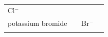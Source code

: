 \begin{enumerate}[noitemsep, label=\textbf{\arabic*}. ]
{\begin{center}
\begin{xtabular*}{\mytablewidth}[t]{|p{10\mystarwidth}|p{10\mystarwidth}|p{10\mystarwidth}|p{10\mystarwidth}|}
    
        \begin{math}\mathrm{Cl}{}^{-}\end{math} &
    
    
     \tabularnewline{}
    
    
        potassium bromide &
    
    
         &
    
    
        \begin{math}\mathrm{Br}{}^{-}\end{math} &
    
    
     \tabularnewline{}
    
    
         &
    
    

\end{xtabular*}
\end{center}}
\end{enumerate}
